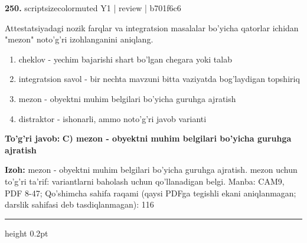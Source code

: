 \documentclass[10pt,a4paper]{article}
\begin{document}
{\bfseries\sffamily\color{ink} 250.} {scriptsizecolor{muted} Y1 | review | b701f6c6}
\par
Attestatsiyadagi nozik farqlar va integratsion masalalar bo'yicha qatorlar ichidan "mezon" noto'g'ri izohlanganini aniqlang.
\begin{enumerate}[label=\Alph*),leftmargin=9mm]
\item cheklov - yechim bajarishi shart bo'lgan chegara yoki talab
\item integratsion savol - bir nechta mavzuni bitta vaziyatda bog'laydigan topshiriq
\item mezon - obyektni muhim belgilari bo'yicha guruhga ajratish
\item distraktor - ishonarli, ammo noto'g'ri javob varianti
\end{enumerate}
\begin{tcolorbox}[enhanced,breakable,colback=teal!4,colframe=teal!60!black,boxrule=0.45pt,arc=1.2mm,left=2.7mm,right=2.7mm,top=1.8mm,bottom=1.8mm,before skip=2mm,after skip=2mm]
{\bfseries\sffamily\color{teal}To'g'ri javob:} \textbf{C) mezon - obyektni muhim belgilari bo'yicha guruhga ajratish}
\par\smallskip
{\bfseries Izoh:} mezon - obyektni muhim belgilari bo'yicha guruhga ajratish. mezon uchun to'g'ri ta'rif: variantlarni baholash uchun qo'llanadigan belgi. Manba: CAM9, PDF 8-47; Qo'shimcha sahifa raqami (qaysi PDFga tegishli ekani aniqlanmagan; darslik sahifasi deb tasdiqlanmagan): 116
\end{tcolorbox}
\vspace{2mm}\hrule height 0.2pt\vspace{3mm}
\end{document}
